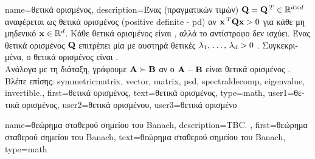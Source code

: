 {name={\foreignlanguage{greek}{θετικά ορισμένος}},
	description={\foreignlanguage{greek}{Ένας}  
		\foreignlanguage{greek}{(πραγματικών τιμών) $\mathbf{Q} = \mathbf{Q}\,^{T} \in \mathbb{R}^{d \times d}$ αναφέρεται ως
		θετικά ορισμένος} (positive definite - pd) \foreignlanguage{greek}{αν ${\bf x}\,^{T} \mathbf{Q} {\bf x} > 0$ για κάθε μη 
		μηδενικό}  ${\bf x} \in \mathbb{R}^{d}$. \foreignlanguage{greek}{Κάθε θετικά ορισμένος}
		 \foreignlanguage{greek}{είναι} , \foreignlanguage{greek}{αλλά το αντίστροφο δεν ισχύει.
		Ένας θετικά ορισμένος}  $\mathbf{Q}$ \foreignlanguage{greek}{επιτρέπει μία}  
		\foreignlanguage{greek}{με αυστηρά θετικές}  $\lambda_{1}, \,\ldots, \,\lambda_{d} > 0$
		\cite{HornMatAnalysis}. \foreignlanguage{greek}{Συγκεκριμένα, ο θετικά ορισμένος}  
		\foreignlanguage{greek}{είναι} .
		\\
		\foreignlanguage{greek}{Ανάλογα με τη}  \foreignlanguage{greek}{διάταξη, γράφουμε ${\bf A} \succ {\bf B}$
		αν ο ${\bf A} - {\bf B}$ είναι θετικά ορισμένος} \cite[\foreignlanguage{greek}{Ενότητα} 2.4]{BoydConvexBook}.
		\\
		\foreignlanguage{greek}{Βλέπε επίσης:} \gls{symmetricmatrix}, \gls{vector}, \gls{matrix}, \gls{psd}, \gls{spectraldecomp}, 
		\gls{eigenvalue}, \gls{invertible}.},
	first={\foreignlanguage{greek}{θετικά ορισμένος}},
	text={\foreignlanguage{greek}{θετικά ορισμένος}},
	type=math,
	user1={\foreignlanguage{greek}{θετικά ορισμένος}}, %
  	user2={\foreignlanguage{greek}{θετικά ορισμένου}}, %
	user3={\foreignlanguage{greek}{θετικά ορισμένο}} %
}

{name={\foreignlanguage{greek}{θεώρημα σταθερού σημείου του} Banach},
	description={TBC. },
    	first={\foreignlanguage{greek}{θεώρημα σταθερού σημείου του} Banach},
	text={\foreignlanguage{greek}{θεώρημα σταθερού σημείου του} Banach},
    	type=math
}

